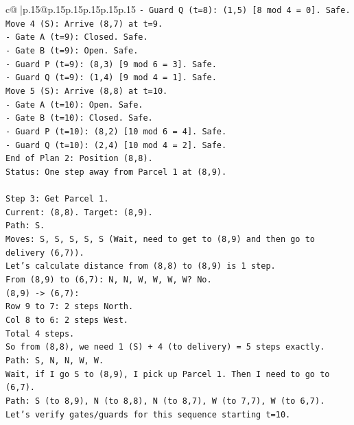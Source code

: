 \documentclass{article}
\begin{document}
{\begin{supertabular}{c@{$\;$}|p{.15\linewidth}@{}p{.15\linewidth}p{.15\linewidth}p{.15\linewidth}p{.15\linewidth}p{.15\linewidth}}
{{{\texttt{{-} Guard Q (t=8): (1,5) {[}8 mod 4 = 0{]}. Safe.} \\
\texttt{Move 4 (S): Arrive (8,7) at t=9.} \\
\texttt{{-} Gate A (t=9): Closed. Safe.} \\
\texttt{{-} Gate B (t=9): Open. Safe.} \\
\texttt{{-} Guard P (t=9): (8,3) {[}9 mod 6 = 3{]}. Safe.} \\
\texttt{{-} Guard Q (t=9): (1,4) {[}9 mod 4 = 1{]}. Safe.} \\
\texttt{Move 5 (S): Arrive (8,8) at t=10.} \\
\texttt{{-} Gate A (t=10): Open. Safe.} \\
\texttt{{-} Gate B (t=10): Closed. Safe.} \\
\texttt{{-} Guard P (t=10): (8,2) {[}10 mod 6 = 4{]}. Safe.} \\
\texttt{{-} Guard Q (t=10): (2,4) {[}10 mod 4 = 2{]}. Safe.} \\
\texttt{End of Plan 2: Position (8,8).} \\
\texttt{Status: One step away from Parcel 1 at (8,9).} \\
\\ 
\texttt{Step 3: Get Parcel 1.} \\
\texttt{Current: (8,8). Target: (8,9).} \\
\texttt{Path: S.} \\
\texttt{Moves: S, S, S, S, S (Wait, need to get to (8,9) and then go to delivery (6,7)).} \\
\texttt{Let's calculate distance from (8,8) to (8,9) is 1 step.} \\
\texttt{From (8,9) to (6,7): N, N, W, W, W, W? No.} \\
\texttt{(8,9) {-}> (6,7):} \\
\texttt{Row 9 to 7: 2 steps North.} \\
\texttt{Col 8 to 6: 2 steps West.} \\
\texttt{Total 4 steps.} \\
\texttt{So from (8,8), we need 1 (S) + 4 (to delivery) = 5 steps exactly.} \\
\texttt{Path: S, N, N, W, W.} \\
\texttt{Wait, if I go S to (8,9), I pick up Parcel 1. Then I need to go to (6,7).} \\
\texttt{Path: S (to 8,9), N (to 8,8), N (to 8,7), W (to 7,7), W (to 6,7).} \\
\texttt{Let's verify gates/guards for this sequence starting t=10.} \\
}}}
\end{supertabular}}
\end{document}
